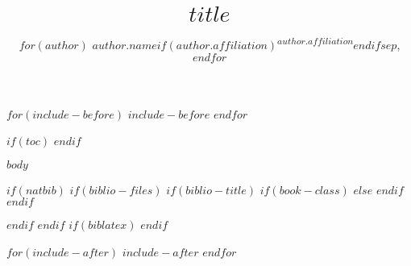 \documentclass[$if(fontsize)$$fontsize$,$endif$$if(lang)$$lang$,$endif$$if(papersize)$$papersize$,$endif$$if(figsintext)$floatsintext,$endif$$for(class)$$class$$sep$,$endfor$]{apa6}
\title{$title$}
\author{
    $for(author)$
      $author.name$$if(author.affiliation)$\textsuperscript{$author.affiliation$}$endif$$sep$,
    $endfor$
  }
\affiliation{
    \vspace{0.5cm}
    $for(affiliation)$
      \textsuperscript{$affiliation.id$} $if(affiliation.institution)$$affiliation.institution$$else$$if(affiliation.city)$$affiliation.city$$endif$$if(affiliation.state)$, $affiliation.state$$endif$$if(affiliation.country)$, $affiliation.country$$endif$$endif$$sep$\\
    $endfor$
  }
\begin{document}
\maketitle

$for(include-before)$
  $include-before$
$endfor$

$if(toc)$
  {
  \hypersetup{linkcolor=black}
  \setcounter{tocdepth}{$toc-depth$}
  \tableofcontents
  }
$endif$

$body$

$if(natbib)$
  $if(biblio-files)$
    $if(biblio-title)$
      $if(book-class)$
        \renewcommand\bibname{$biblio-title$}
      $else$
        \renewcommand\refname{$biblio-title$}
      $endif$
    $endif$
  

  $endif$
$endif$
$if(biblatex)$
  \printbibliography
$endif$

$for(include-after)$
  $include-after$
$endfor$
\end{document}
